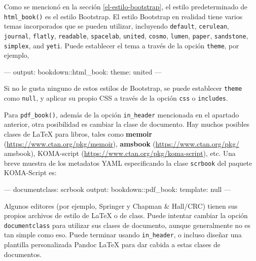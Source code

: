 \documentclass[12pt,]{krantz}
\makeatletter
\newenvironment{Shaded}{\begin{snugshade}}{\end{snugshade}}
\newcommand{\DataTypeTok}[1]{\textcolor[rgb]{0.13,0.29,0.53}{{#1}}}
\newcommand{\OtherTok}[1]{\textcolor[rgb]{0.56,0.35,0.01}{{#1}}}
\newcommand{\FunctionTok}[1]{\textcolor[rgb]{0.00,0.00,0.00}{{#1}}}
\newcommand{\NormalTok}[1]{{#1}}
\newenvironment{kframe}{%
\medskip{}
\setlength{\fboxsep}{.8em}
 \def\at@end@of@kframe{}%
 \ifinner\ifhmode%
  \def\at@end@of@kframe{\end{minipage}}%
  \begin{minipage}{\columnwidth}%
 \fi\fi%
 \def\FrameCommand##1{\hskip\@totalleftmargin \hskip-\fboxsep
 \colorbox{shadecolor}{##1}\hskip-\fboxsep
     \hskip-\linewidth \hskip-\@totalleftmargin \hskip\columnwidth}%
 \MakeFramed {\advance\hsize-\width
   \@totalleftmargin\z@ \linewidth\hsize
   \@setminipage}}%
 {\par\unskip\endMakeFramed%
 \at@end@of@kframe}
\renewenvironment{Shaded}{\begin{kframe}}{\end{kframe}}
\theoremstyle{definition}
\theoremstyle{definition}
\theoremstyle{remark}
\makeatother
\begin{document}
Como se mencionó en la sección \ref{el-estilo-bootstrap}, el estilo
predeterminado de \texttt{html\_book()} es el estilo Bootstrap. El
estilo Bootstrap en realidad tiene varios temas incorporados que se
pueden utilizar, incluyendo \texttt{default}, \texttt{cerulean},
\texttt{journal}, \texttt{flatly}, \texttt{readable}, \texttt{spacelab},
\texttt{united}, \texttt{cosmo}, \texttt{lumen}, \texttt{paper},
\texttt{sandstone}, \texttt{simplex}, and \texttt{yeti}. Puede
establecer el tema a través de la opción \texttt{theme}, por ejemplo,

\begin{Shaded}
\begin{Highlighting}[]
\OtherTok{---}
\FunctionTok{output:}
  \FunctionTok{bookdown:}\NormalTok{:html_book:}
    \FunctionTok{theme:} \NormalTok{united}
\OtherTok{---}
\end{Highlighting}
\end{Shaded}

Si no le gusta ninguno de estos estilos de Bootstrap, se puede
establecer \texttt{theme} como \texttt{null}, y aplicar su propio CSS a
través de la opción \texttt{css} o \texttt{includes}.

Para \texttt{pdf\_book()}, además de la opción \texttt{in\_header}
mencionada en el apartado anterior, otra posibilidad es cambiar la clase
de documento. Hay muchos posibles clases de LaTeX para libros, tales
como \textbf{memoir} (\url{https://www.ctan.org/pkg/memoir}),
\textbf{amsbook} (\url{https://www.ctan.org/pkg/} amsbook), KOMA-script
(\url{https://www.ctan.org/pkg/koma-script}), etc. Una breve muestra de
los metadatos YAML especificando la clase \texttt{scrbook} del paquete
KOMA-Script es:

\begin{Shaded}
\begin{Highlighting}[]
\OtherTok{---}
\FunctionTok{documentclass:} \NormalTok{scrbook}
\FunctionTok{output:}
  \FunctionTok{bookdown:}\NormalTok{:pdf_book:}
    \FunctionTok{template:} \DataTypeTok{null}
\OtherTok{---}
\end{Highlighting}
\end{Shaded}

Algunos editores (por ejemplo, Springer y Chapman \& Hall/CRC) tienen
sus propios archivos de estilo de LaTeX o de class. Puede intentar
cambiar la opción \texttt{documentclass} para utilizar sus clases de
documento, aunque generalmente no es tan simple como eso. Puede terminar
usando \texttt{in\_header}, o incluso diseñar una plantilla
personalizada Pandoc LaTeX para dar cabida a estas clases de documentos.
\end{document}
